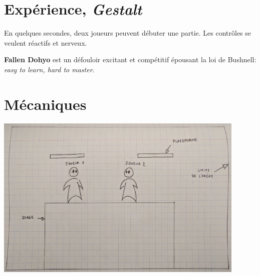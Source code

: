 \documentclass[french]{report}
\newcommand{\gamename}{\textbf{Fallen Dohyo} }
\begin{document}
\section{Expérience, \textit{Gestalt}}

    En quelques secondes, deux joueurs peuvent débuter une partie.
    Les contrôles se veulent réactifs et nerveux.

    \gamename est un défouloir excitant et compétitif
    épousant la loi de Bushnell: \textit{easy to learn, hard to master}.

\section{Mécaniques}

\begin{center}
    \includegraphics[width=12cm]{stage}
\end{center}
\end{document}
